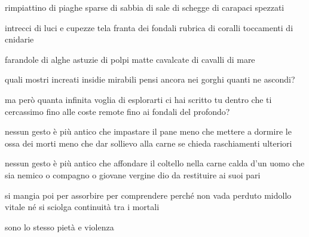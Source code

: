 \begin{poem}
	\begin{stanza}
		rimpiattino di piaghe\verseline
		sparse di sabbia\verseline
		di sale di schegge\verseline
		di carapaci spezzati
	\end{stanza}

	\begin{stanza}
		intrecci di luci e cupezze\verseline
		tela franta dei fondali\verseline
		rubrica di coralli\verseline
		toccamenti di cnidarie
	\end{stanza}

	\begin{stanza}
		farandole di alghe\verseline
		astuzie di polpi\verseline
		matte cavalcate\verseline
		di cavalli di mare
	\end{stanza}

	\begin{stanza}
		quali mostri increati\verseline
		insidie mirabili\verseline
		pensi ancora nei gorghi\verseline
		quanti ne ascondi?
	\end{stanza}

	\begin{stanza}
		ma però quanta\verseline
		infinita voglia di esplorarti\verseline
		ci hai scritto tu dentro\verseline
		che ti cercassimo\verseline
		fino alle coste remote\verseline
		fino ai fondali del profondo?
	\end{stanza}
\end{poem}

\clearpage


\begin{poem}
	\begin{stanza}
		nessun gesto è più antico\verseline
		che impastare il pane\verseline
		meno che mettere a dormire\verseline
		le ossa dei morti\verseline
		meno che dar sollievo alla carne\verseline
		se chieda raschiamenti ulteriori
	\end{stanza}

	\begin{stanza}
		nessun gesto è più antico\verseline
		che affondare il coltello\verseline
		nella carne calda d’un uomo\verseline
		che sia nemico o compagno\verseline
		o giovane vergine dio\verseline
		da restituire ai suoi pari
	\end{stanza}

	\begin{stanza}
		si mangia poi\verseline
		per assorbire\verseline
		per comprendere\verseline
		perché non vada perduto midollo vitale\verseline
		né si sciolga continuità tra i mortali
	\end{stanza}

	\begin{stanza}
		sono lo stesso pietà e violenza
	\end{stanza}
\end{poem}

